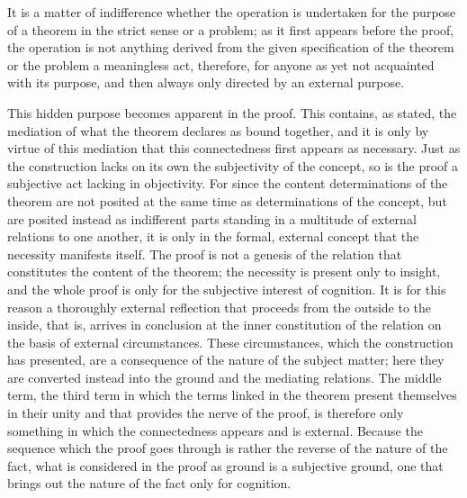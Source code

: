 It is a matter of indifference
whether the operation is undertaken
for the purpose of a theorem
in the strict sense or a problem;
as it first appears before the proof,
the operation is not anything derived
from the given specification of the theorem
or the problem a meaningless act, therefore,
for anyone as yet not acquainted with its purpose,
and then always only directed by an external purpose.

This hidden purpose becomes apparent in the proof.
This contains, as stated, the mediation of what
the theorem declares as bound together,
and it is only by virtue of this mediation
that this connectedness first appears as necessary.
Just as the construction lacks on its own
the subjectivity of the concept,
so is the proof a subjective act lacking in objectivity.
For since the content determinations of the theorem are
not posited at the same time as determinations of the concept,
but are posited instead as indifferent parts standing in
a multitude of external relations to one another,
it is only in the formal, external concept
that the necessity manifests itself.
The proof is not a genesis of the relation
that constitutes the content of the theorem;
the necessity is present only to insight,
and the whole proof is only for
the subjective interest of cognition.
It is for this reason
a thoroughly external reflection
that proceeds from the outside to the inside,
that is, arrives in conclusion at
the inner constitution of the relation
on the basis of external circumstances.
These circumstances, which the construction has presented,
are a consequence of the nature of the subject matter;
here they are converted instead into the ground
and the mediating relations.
The middle term, the third term in which
the terms linked in the theorem
present themselves in their unity
and that provides the nerve of the proof,
is therefore only something in which
the connectedness appears and is external.
Because the sequence which the proof goes through is
rather the reverse of the nature of the fact,
what is considered in the proof as ground is a subjective ground,
one that brings out the nature of the fact only for cognition.

